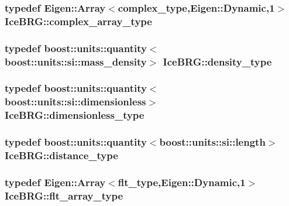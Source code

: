 \hypertarget{namespaceIceBRG_a02e79930ea75411b7883d2786b2fc5d7}{
\subsubsection[{complex\-\_\-array\-\_\-type}]{\setlength{\rightskip}{0pt plus 5cm}typedef Eigen\-::\-Array$<${\bf complex\-\_\-type},Eigen\-::\-Dynamic,1$>$ {\bf Ice\-B\-R\-G\-::complex\-\_\-array\-\_\-type}}}\label{namespaceIceBRG_a02e79930ea75411b7883d2786b2fc5d7}
\hypertarget{namespaceIceBRG_a9f5e5cdd641bb4c06f7305dfb5ae0238}{
\subsubsection[{density\-\_\-type}]{\setlength{\rightskip}{0pt plus 5cm}typedef boost\-::units\-::quantity$<$boost\-::units\-::si\-::mass\-\_\-density$>$ {\bf Ice\-B\-R\-G\-::density\-\_\-type}}}\label{namespaceIceBRG_a9f5e5cdd641bb4c06f7305dfb5ae0238}
\hypertarget{namespaceIceBRG_a9ae604a735e60597c32674c8cd07706f}{
\subsubsection[{dimensionless\-\_\-type}]{\setlength{\rightskip}{0pt plus 5cm}typedef boost\-::units\-::quantity$<$boost\-::units\-::si\-::dimensionless$>$ {\bf Ice\-B\-R\-G\-::dimensionless\-\_\-type}}}\label{namespaceIceBRG_a9ae604a735e60597c32674c8cd07706f}
\hypertarget{namespaceIceBRG_a45499647eb87e24c10ab32c628711cec}{
\subsubsection[{distance\-\_\-type}]{\setlength{\rightskip}{0pt plus 5cm}typedef boost\-::units\-::quantity$<$boost\-::units\-::si\-::length$>$ {\bf Ice\-B\-R\-G\-::distance\-\_\-type}}}\label{namespaceIceBRG_a45499647eb87e24c10ab32c628711cec}
\hypertarget{namespaceIceBRG_acdca5c05302480eba6ba053449643a6d}{
\subsubsection[{flt\-\_\-array\-\_\-type}]{\setlength{\rightskip}{0pt plus 5cm}typedef Eigen\-::\-Array$<${\bf flt\-\_\-type},Eigen\-::\-Dynamic,1$>$ {\bf Ice\-B\-R\-G\-::flt\-\_\-array\-\_\-type}}}\label{namespaceIceBRG_acdca5c05302480eba6ba053449643a6d}
